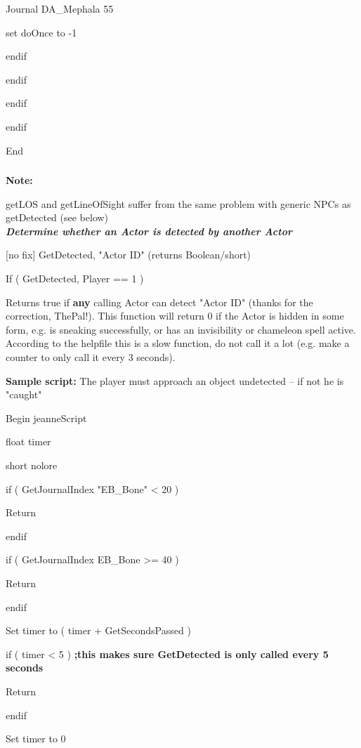 \documentclass[
]{article}
\begin{document}
Journal DA\_Mephala 55

set doOnce to -1

endif

endif

endif

endif

End

\hypertarget{section-2}{%
\subsubsection{}\label{section-2}}

\textbf{Note:}

getLOS and getLineOfSight suffer from the same problem with generic NPCs
as getDetected (see below)\\
\protect\hypertarget{_Toc182634542}{}{}\emph{\textbf{Determine whether
an Actor is detected by another Actor}}

{[}no fix{]} GetDetected, "Actor ID" (returns Boolean/short)

If ( GetDetected, Player == 1 )

Returns true if \textbf{any} calling Actor can detect "Actor ID" (thanks
for the correction, ThePal!). This function will return 0 if the Actor
is hidden in some form, e.g. is sneaking successfully, or has an
invisibility or chameleon spell active. According to the helpfile this
is a slow function, do not call it a lot (e.g. make a counter to only
call it every 3 seconds).

\textbf{Sample script:} The player must approach an object undetected --
if not he is "caught"

Begin jeanneScript

float timer

short nolore

if ( GetJournalIndex "EB\_Bone" \textless{} 20 )

Return

endif

if ( GetJournalIndex EB\_Bone \textgreater= 40 )

Return

endif

Set timer to ( timer + GetSecondsPassed )

if ( timer \textless{} 5 ) \textbf{;this makes sure GetDetected is only
called every 5 seconds}

Return

endif

Set timer to 0
\end{document}
